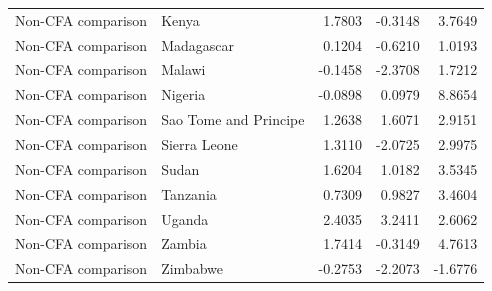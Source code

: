 \begin{table}
\begin{tabular}[t]{llrrr}
Non-CFA comparison & Kenya & 1.7803 & -0.3148 & 3.7649\\
\addlinespace
Non-CFA comparison & Madagascar & 0.1204 & -0.6210 & 1.0193\\
Non-CFA comparison & Malawi & -0.1458 & -2.3708 & 1.7212\\
Non-CFA comparison & Nigeria & -0.0898 & 0.0979 & 8.8654\\
Non-CFA comparison & Sao Tome and Principe & 1.2638 & 1.6071 & 2.9151\\
Non-CFA comparison & Sierra Leone & 1.3110 & -2.0725 & 2.9975\\
\addlinespace
Non-CFA comparison & Sudan & 1.6204 & 1.0182 & 3.5345\\
Non-CFA comparison & Tanzania & 0.7309 & 0.9827 & 3.4604\\
Non-CFA comparison & Uganda & 2.4035 & 3.2411 & 2.6062\\
Non-CFA comparison & Zambia & 1.7414 & -0.3149 & 4.7613\\
Non-CFA comparison & Zimbabwe & -0.2753 & -2.2073 & -1.6776\\
\bottomrule
\end{tabular}
\end{table}
